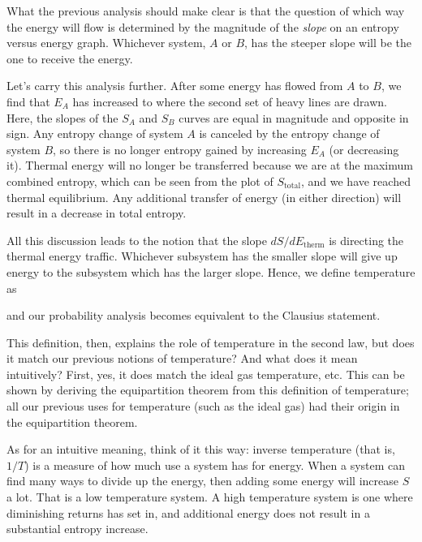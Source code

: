 What the previous analysis should make clear is that the question of
which way the energy will flow is determined by the magnitude of the
{\it slope\/} on an entropy versus energy graph.  Whichever system,
$A$ or $B$, has the steeper slope will be the one to receive the
energy.

Let's carry this analysis further.  After some energy has flowed from
$A$ to $B$, we find that $E_A$ has increased to where the second set
of heavy lines are drawn.  Here, the slopes of the $S_A$ and $S_B$
curves are equal in magnitude and opposite in sign.  Any entropy
change of system $A$ is canceled by the entropy change of system $B$,
so there is no longer entropy gained by increasing $E_A$ (or
decreasing it).   Thermal energy will no longer be transferred because
we are at the maximum combined entropy, which can be seen from the
plot of $S_\text{total}$, and we have reached thermal equilibrium.
Any additional transfer of energy (in either direction) will
result in a decrease in total entropy.

All this discussion leads to the notion that the slope
$dS/dE_\text{therm}$ is directing the thermal energy traffic.
Whichever subsystem has the smaller slope will give up energy to the
subsystem which has the larger slope.  Hence, we define temperature as


\noindent and our probability analysis becomes equivalent to the Clausius
statement.

This definition, then, explains the role of temperature in the second
law, but does it match our previous notions of temperature?  And what
does it mean intuitively?  First, yes, it does match the ideal gas
temperature, etc.  This can be shown by deriving the equipartition
theorem from this definition of temperature; all our previous uses for
temperature (such as the ideal gas) had their origin in the
equipartition theorem.

As for an intuitive meaning, think of it this way: inverse temperature
(that is, $1/T$) is a measure of how much use a system has for
energy.  When a system can find many ways to divide up the energy,
then adding some energy will increase $S$ a lot.  That is a low
temperature system.  A high temperature system is one where
diminishing returns has set in, and additional energy does not result
in a substantial entropy increase.

